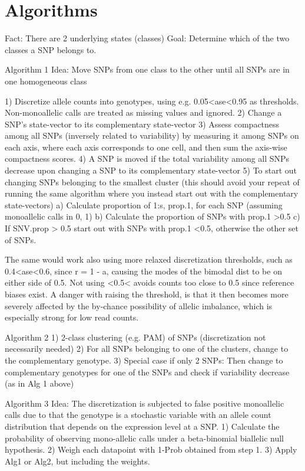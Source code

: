\section{Algorithms}
Fact: There are 2 underlying states (classes)
Goal: Determine which of the two classes a SNP belongs to.

Algorithm 1
Idea: Move SNPs from one class to the other until all SNPs are in one homogeneous class

1) Discretize allele counts into genotypes, using e.g. 0.05<ase<0.95 as thresholds. Non-monoallelic calls are treated as missing values and ignored.
2) Change a SNP's state-vector to its complementary state-vector
3) Assess compactness among all SNPs (inversely related to variability) by measuring it among SNPs on each axis, where each axis corresponds to one cell, and then sum the axis-wise compactness scores.
4) A SNP is moved if the total variability among all SNPs decrease upon changing a SNP to its complementary state-vector
5) To start out changing SNPs belonging to the smallest cluster (this should avoid your repeat of running the same algorithm where you instead start out with the complementary state-vectors)
a) Calculate proportion of 1:s, prop.1, for each SNP (assuming monoallelic calls in {0, 1})
b) Calculate the proportion of SNPs with prop.1 >0.5
c) If SNV.prop > 0.5 start out with SNPs with prop.1 <0.5, otherwise the other set of SNPs.

The same would work also using more relaxed discretization thresholds, such as 0.4<ase<0.6, since r = 1 - a, causing the modes of the bimodal dist to be on either side of 0.5.
Not using <0.5< avoids counts too close to 0.5 since reference biases exist. A danger with raising the threshold, is that it then becomes more severely affected by the by-chance possibility of allelic imbalance, which is especially strong for low read counts.

Algorithm 2
1) 2-class clustering (e.g. PAM) of SNPs (discretization not necessarily needed)
2) For all SNPs belonging to one of the clusters, change to the complementary genotype.
3) Special case if only 2 SNPs: Then change to complementary genotypes for one of the SNPs and check if variability decrease (as in Alg 1 above)

Algorithm 3
Idea: The discretization is subjected to false positive monoallelic calls due to that the genotype is a stochastic variable with an allele count distribution that depends on the expression level at a SNP.
1) Calculate the probability of observing mono-allelic calls under a beta-binomial biallelic null hypothesis.
2) Weigh each datapoint with 1-Prob obtained from step 1. 
3) Apply Alg1 or Alg2, but including the weights.

